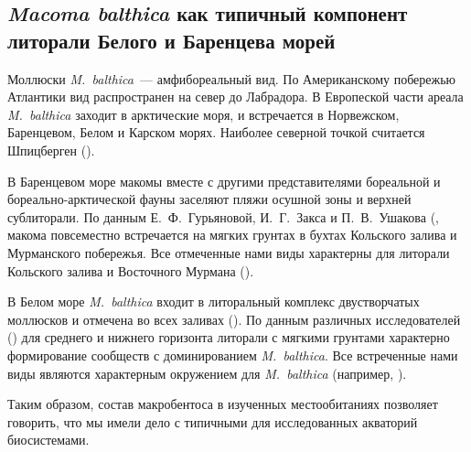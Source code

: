 		\subsection{{\it Macoma balthica} как типичный компонент литорали Белого и Баренцева морей}

Моллюски {\it M.~balthica}~--- амфибореальный вид. 
По Американскому побережью Атлантики вид распространен на север до Лабрадора.
В Европеской части ареала {\it M.~balthica} заходит в арктические моря, и встречается в Норвежском, Баренцевом, Белом и Карском морях.
Наиболее северной точкой считается Шпицберген (\cite{Zacepin_Filatova_1968}).

В Баренцевом море макомы вместе с другими представителями бореальной и бореально-арктической фауны заселяют пляжи осушной зоны и верхней сублиторали. 
По данным Е.~Ф.~Гурьяновой, И.~Г.~Закса и П.~В.~Ушакова (\cite{Guryanova_et_al_1928, Guryanova_Ushakov_1929, Guryanova_et_al_1930}, макома повсеместно встречается на мягких грунтах в бухтах Кольского залива и Мурманского побережья. 
Все отмеченные нами виды характерны для литорали Кольского залива и Восточного Мурмана (\cite{Derugin_1915, Guryanova_Ushakov_1929}).

В Белом море \textit{M.~balthica} входит в литоральный комплекс двустворчатых моллюсков и отмечена во всех заливах (\cite{Naumov_2006}).
По данным различных исследователей (\cite{Babkov_Golikov_1984, Naumov_Fedyakov_1993}) для среднего и нижнего горизонта литорали с мягкими грунтами характерно формирование сообществ с доминированием \textit{M.~balthica}. 
Все встреченные нами виды являются характерным окружением для \textit{M.~balthica} (например, \cite{Chertoprud_et_al_2004, Naumov_2006, Gerasimova_et_al_2010, Derevenschikov_Kravets_2010, Stolyarov_2010}).

Таким образом, состав макробентоса в изученных местообитаниях позволяет говорить, что  мы имели дело с типичными для исследованных акваторий биосистемами. 


\afterpage{\clearpage}

